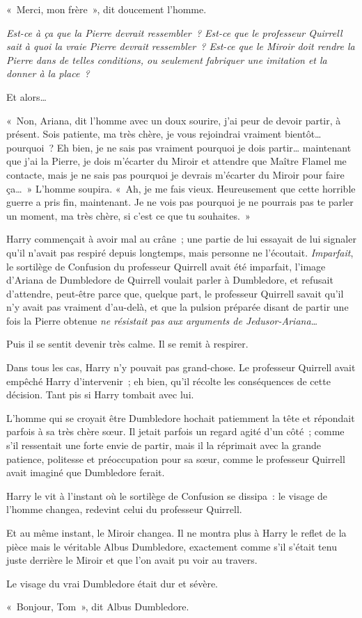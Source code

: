 «~Merci, mon frère~», dit doucement l'homme.

\emph{Est-ce à ça que la Pierre devrait ressembler~?
Est-ce que le professeur Quirrell sait à quoi la vraie Pierre devrait ressembler~?
Est-ce que le Miroir doit rendre la Pierre dans de telles conditions, ou seulement fabriquer une imitation et la donner à la place~?}

Et alors…

«~Non, Ariana, dit l'homme avec un doux sourire, j'ai peur de devoir partir, à présent.
Sois patiente, ma très chère, je vous rejoindrai vraiment bientôt… pourquoi~?
Eh bien, je ne sais pas vraiment pourquoi je dois partir… maintenant que j'ai la Pierre, je dois m'écarter du Miroir et attendre que Maître Flamel me contacte, mais je ne sais pas pourquoi je devrais m'écarter du Miroir pour faire ça…~»
L'homme soupira.
«~Ah, je me fais vieux.
Heureusement que cette horrible guerre a pris fin, maintenant.
Je ne vois pas pourquoi je ne pourrais pas te parler un moment, ma très chère, si c'est ce que tu souhaites.~»

Harry commençait à avoir mal au crâne~; une partie de lui essayait de lui signaler qu'il n'avait pas respiré depuis longtemps, mais personne ne l'écoutait.
\emph{Imparfait}, le sortilège de Confusion du professeur Quirrell avait été imparfait, l'image d'Ariana de Dumbledore de Quirrell voulait parler à Dumbledore, et refusait d'attendre, peut-être parce que, quelque part, le professeur Quirrell savait qu'il n'y avait pas vraiment d'au-delà, et que la pulsion préparée disant de partir une fois la Pierre obtenue \emph{ne résistait pas aux arguments de Jedusor-Ariana…}

Puis il se sentit devenir très calme.
Il se remit à respirer.

Dans tous les cas, Harry n'y pouvait pas grand-chose.
Le professeur Quirrell avait empêché Harry d'intervenir~; eh bien, qu'il récolte les conséquences de cette décision.
Tant pis si Harry tombait avec lui.

L'homme qui se croyait être Dumbledore hochait patiemment la tête et répondait parfois à sa très chère sœur.
Il jetait parfois un regard agité d'un côté~; comme s'il ressentait une forte envie de partir, mais il la réprimait avec la grande patience, politesse et préoccupation pour sa sœur, comme le professeur Quirrell avait imaginé que Dumbledore ferait.

Harry le vit à l'instant où le sortilège de Confusion se dissipa~: le visage de l'homme changea, redevint celui du professeur Quirrell.

Et au même instant, le Miroir changea.
Il ne montra plus à Harry le reflet de la pièce mais le véritable Albus Dumbledore, exactement comme s'il s'était tenu juste derrière le Miroir et que l'on avait pu voir au travers.

Le visage du vrai Dumbledore était dur et sévère.

«~Bonjour, Tom~», dit Albus Dumbledore.
